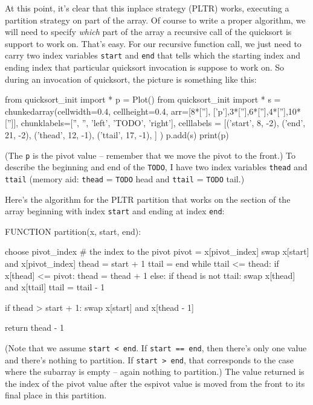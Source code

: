 At this point, it's clear that this inplace
strategy (PLTR) works, executing a partition strategy on part of the array.
Of course to write a proper algorithm, we will need to specify
\textit{which} part of the array a recursive call of the quicksort
is support to work on.
That's easy. For our recursive function call,
we just need to carry two index variables
\verb!start! and \verb!end! that tells which the starting
index and ending index that particular quicksort invocation
is suppose to work on.
So during an invocation of quicksort, the picture is something like this:

\begin{python}
from quicksort_init import *
p = Plot()
from quicksort_init import *
s = chunkedarray(cellwidth=0.4, 
                   cellheight=0.4,
                   arr=[8*[''], ['p'],3*[''],6*[''],4*[''],10*['']],
                   chunklabels=['', '', 'left', 'TODO', 'right'],
                   celllabels = [('start', 8, -2),
                                 ('end',   21, -2),
                                 ('thead', 12, -1),
                                 ('ttail', 17, -1),
                                ]
)
p.add(s)
print(p)
\end{python}
(The \verb!p! is the pivot value -- remember that we move the pivot to
the front.)
To describe the beginning and end of the \verb!TODO!, I have
two index variables \verb!thead! and \verb!ttail!
(memory aid:
\verb!thead! = \verb!TODO! head and 
\verb!ttail! = \verb!TODO! tail.)



Here's the algorithm for the PLTR partition
that works on the section of the array 
beginning with index \verb!start! and ending at index
\verb!end!:
\begin{console}
FUNCTION partition(x, start, end):

    choose pivot_index # the index to the pivot
    pivot = x[pivot_index]
    swap x[start] and x[pivot_index]
    thead = start + 1
    ttail = end
    while ttail <= thead:
        if x[thead] <= pivot:
            thead = thead + 1
        else:
            if thead is not ttail:
               swap x[thead] and x[ttail]
            ttail = ttail - 1
    
    if thead > start + 1:
        swap x[start] and x[thead - 1]

    return thead - 1
\end{console}
(Note that we assume \verb!start < end!.
If \verb!start == end!, then there's only one value and
there's nothing to partition.
If \verb!start > end!, that corresponds to the case where
the subarray is empty -- again nothing to partition.)
The value returned is the index of the pivot value after the espivot
value is moved from the front to its final place in this partition.

